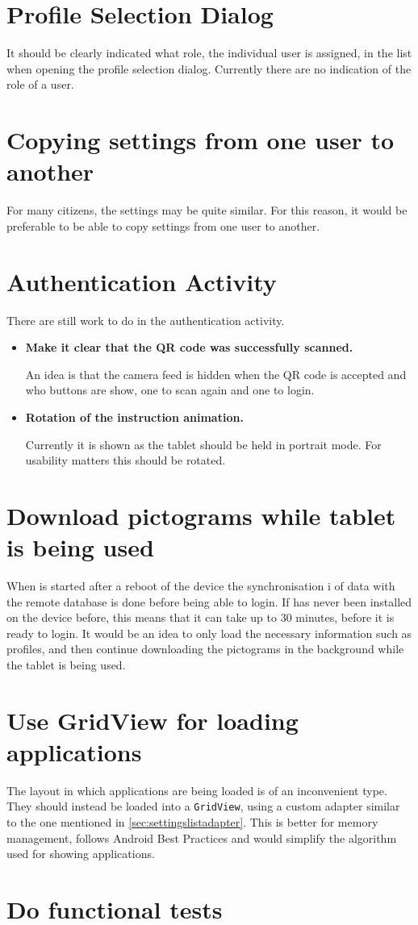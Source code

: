 \section{Profile Selection Dialog}
It should be clearly indicated what role, the individual user is assigned, in the list when opening the profile selection dialog.
Currently there are no indication of the role of a user.

\section{Copying settings from one user to another}
For many citizens, the settings may be quite similar.
For this reason, it would be preferable to be able to copy settings from one user to another.

\section{Authentication Activity}
There are still work to do in the authentication activity.

\begin{itemize}
	\item \textbf{Make it clear that the QR code was successfully scanned.}

	An idea is that the camera feed is hidden when the QR code is accepted and who buttons are show, one to scan again and one to login.
	\item \textbf{Rotation of the instruction animation.}

	Currently it is shown as the tablet should be held in portrait mode. 
	For usability matters this should be rotated. 
\end{itemize}

\section{Download pictograms while tablet is being used}
When \launcher is started after a reboot of the device the synchronisation i of data with the remote database is done before being able to login.
If \launcher has never been installed on the device before, this means that it can take up to 30 minutes, before it is ready to login.
It would be an idea to only load the necessary information such as profiles, and then continue downloading the pictograms in the background while the tablet is being used.

\section{Use GridView for loading applications}
The layout in which applications are being loaded is of an inconvenient type. 
They should instead be loaded into a \lstinline|GridView|, using a custom adapter similar to the one mentioned in \cref{sec:settingslistadapter}. 
This is better for memory management, follows Android Best Practices and would simplify the algorithm used for showing applications. 

\section{Do functional tests}
